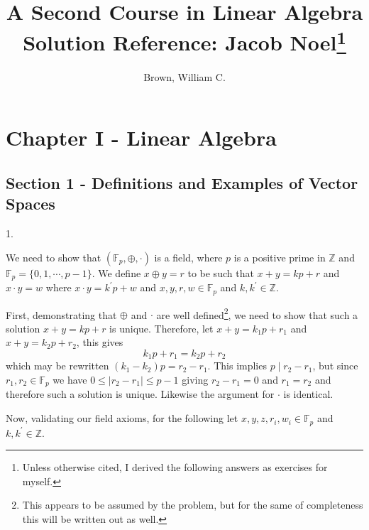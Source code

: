 \documentclass[letterpaper,11pt]{article}
\theoremstyle{definition}
\begin{document}
\title{A Second Course in Linear Algebra \\ {\small Solution Reference: Jacob Noel\footnote{Unless otherwise cited, I derived the following answers as exercises for myself. }}}
\author{Brown, William C.}


{\let\newpage\relax\maketitle}

\pagebreak
\section*{Chapter I - Linear Algebra}

\subsection*{Section 1 - Definitions and Examples of Vector Spaces}


\begin{flushleft}
	1.
\end{flushleft}

We need to show that $(\mathbb{F}_p, \oplus, \cdot)$ is a field, where $p$ is a positive prime in $\mathbb{Z}$ and $\mathbb{F}_p = \{0, 1, \cdots, p - 1\}$. We define $x \oplus y = r$ to be such that $x + y = kp + r$ and $x \cdot y = w$ where $x \cdot y = k^\prime p + w$ and $x, y, r, w \in \mathbb{F}_p$ and $k, k^\prime \in \mathbb{Z}$. 

First, demonstrating that $\oplus$ and $\cdot$ are well defined\footnote{This appears to be assumed by the problem, but for the same of completeness this will be written out as well.}, we need to show that such a solution $x + y = kp + r$ is unique. Therefore, let $x + y = k_1p + r_1$ and $x + y = k_2p + r_2$, this gives \[k_1p + r_1 = k_2p + r_2\] which may be rewritten $(k_1 - k_2)p = r_2 - r_1$. This implies $p \mid r_2 - r_1$, but since $r_1, r_2 \in \mathbb{F}_p$ we have $0 \leq |r_2 - r_1| \leq p-1$ giving $r_2 - r_1 = 0$ and $r_1 = r_2$ and therefore such a solution is unique. Likewise the argument for $\cdot$ is identical. 

Now, validating our field axioms, for the following let $x, y, z, r_i, w_i \in \mathbb{F}_p$ and $k, k^\prime \in \mathbb{Z}$. 
\end{document}
